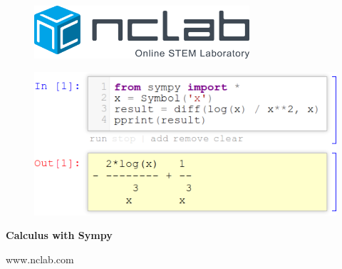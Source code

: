 \documentclass{article}
\begin{document}
\large

\vbox{}
\begin{figure}[!ht]
\includegraphics[width=8cm]{img/logo.png}
\vspace{29mm}
\end{figure}

\begin{figure}[!ht]
\begin{center}
\hspace{-20mm}
\includegraphics[width=14cm]{img/intro-frontpage.png}
\vspace{29mm}
\end{center}
\end{figure}

\centerline{\Huge \bf Calculus with Sympy}

\vfill

\centerline{\Large www.nclab.com}

\newpage




\section*{}
\small


\end{document}
